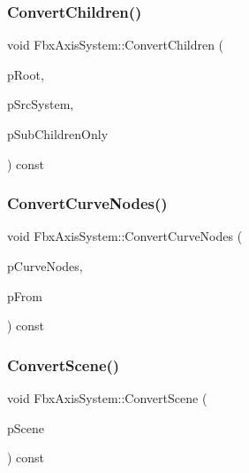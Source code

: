 \subsubsection{\texorpdfstring{Convert\+Children()}{ConvertChildren()}\hspace{0.1cm}{\footnotesize\ttfamily [2/2]}}
{\footnotesize\ttfamily void Fbx\+Axis\+System\+::\+Convert\+Children (\begin{DoxyParamCaption}\item[{\hyperlink{class_fbx_node}{Fbx\+Node} $\ast$}]{p\+Root,  }\item[{const \hyperlink{class_fbx_axis_system}{Fbx\+Axis\+System} \&}]{p\+Src\+System,  }\item[{bool}]{p\+Sub\+Children\+Only }\end{DoxyParamCaption}) const\hspace{0.3cm}{\ttfamily [protected]}}

\mbox{\label{class_fbx_axis_system_a39608f5f990b1ab304f13ee2b6df64ea}} 
\subsubsection{\texorpdfstring{Convert\+Curve\+Nodes()}{ConvertCurveNodes()}}
{\footnotesize\ttfamily void Fbx\+Axis\+System\+::\+Convert\+Curve\+Nodes (\begin{DoxyParamCaption}\item[{\hyperlink{class_fbx_array}{Fbx\+Array}$<$ \hyperlink{class_fbx_anim_curve_node}{Fbx\+Anim\+Curve\+Node} $\ast$$>$ \&}]{p\+Curve\+Nodes,  }\item[{const \hyperlink{class_fbx_axis_system}{Fbx\+Axis\+System} \&}]{p\+From }\end{DoxyParamCaption}) const\hspace{0.3cm}{\ttfamily [protected]}}

\mbox{\label{class_fbx_axis_system_abb9a361cd8d245c60e68b05868c67b4e}} 
\subsubsection{\texorpdfstring{Convert\+Scene()}{ConvertScene()}\hspace{0.1cm}{\footnotesize\ttfamily [1/2]}}
{\footnotesize\ttfamily void Fbx\+Axis\+System\+::\+Convert\+Scene (\begin{DoxyParamCaption}\item[{\hyperlink{class_fbx_scene}{Fbx\+Scene} $\ast$}]{p\+Scene }\end{DoxyParamCaption}) const}

